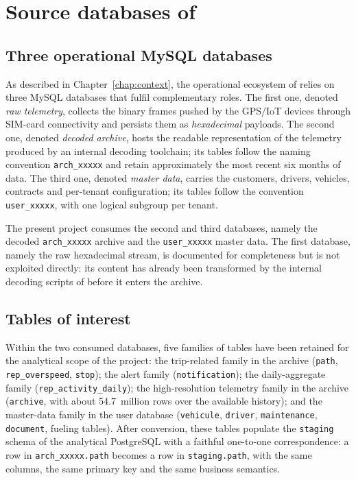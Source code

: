 \section{Source databases of \hostorg}

\subsection{Three operational MySQL databases}
As described in Chapter~\ref{chap:context}, the operational ecosystem of \hostorg{} relies on three MySQL databases that fulfil complementary roles. The first one, denoted \emph{raw telemetry}, collects the binary frames pushed by the GPS/IoT devices through SIM-card connectivity and persists them as \emph{hexadecimal} payloads. The second one, denoted \emph{decoded archive}, hosts the readable representation of the telemetry produced by an internal decoding toolchain; its tables follow the naming convention \texttt{arch\_xxxxx} and retain approximately the most recent six months of data. The third one, denoted \emph{master data}, carries the customers, drivers, vehicles, contracts and per-tenant configuration; its tables follow the convention \texttt{user\_xxxxx}, with one logical subgroup per tenant.

The present project consumes the second and third databases, namely the decoded \texttt{arch\_xxxxx} archive and the \texttt{user\_xxxxx} master data. The first database, namely the raw hexadecimal stream, is documented for completeness but is not exploited directly: its content has already been transformed by the internal decoding scripts of \hostorg{} before it enters the archive.

\subsection{Tables of interest}
Within the two consumed databases, five families of tables have been retained for the analytical scope of the project: the trip-related family in the archive (\texttt{path}, \texttt{rep\_overspeed}, \texttt{stop}); the alert family (\texttt{notification}); the daily-aggregate family (\texttt{rep\_activity\_daily}); the high-resolution telemetry family in the archive (\texttt{archive}, with about 54.7~million rows over the available history); and the master-data family in the user database (\texttt{vehicule}, \texttt{driver}, \texttt{maintenance}, \texttt{document}, fueling tables). After conversion, these tables populate the \texttt{staging} schema of the analytical PostgreSQL with a faithful one-to-one correspondence: a row in \texttt{arch\_xxxxx.path} becomes a row in \texttt{staging.path}, with the same columns, the same primary key and the same business semantics.

